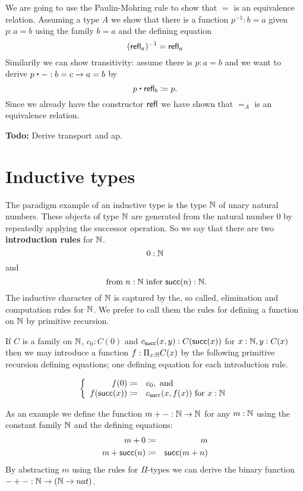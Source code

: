We are going to use the Paulin-Mohring rule to show that $=$ is an
equivalence relation. Assuming a type $A$ we show that there is a function
$p^{-1} : b = a$ given $p : a = b$ using the family $b = a$ and
the defining equation
\[ (\mathsf{refl}_{a})^{-1} = \mathsf{refl}_{a} \]
Similarily we can show transitivity: assume there is $p : a = b$ and
we want to derive $p \ct - : b = c \to a = b$ by
\[ p \ct \refl{b} \defeq p.\]
Since we already have the constructor $\mathsf{refl}_{}$ we have shown that $=_A$
is an equivalence relation. 


\textbf{Todo:} Derive transport and ap.

\section{Inductive types}
\label{sec:inductive-types}

The paradigm example of an inductive type is the type $\mathbb{N}$ of unary natural numbers.  These objects of type $\mathbb{N}$ are generated from the natural number $0$ by repeatedly applying the successor operation.  So we say that there are two {\bf introduction rules} for $\mathbb{N}$. 
  \[ 0:\mathbb{N}\]
and
  \[ \mbox{ from $n:\mathbb{N}$ infer $\mathsf{succ}(n):\mathbb{N}$}.\]
The inductive character of $\mathbb{N}$ is captured by the, so called, elimination and computation rules for $\mathbb{N}$.  We prefer to call them the rules for defining a function on $\mathbb{N}$ by primitive recursion. 

If $C$ is a family on $\mathbb{N}$, $c_0:C(0)$ and $c_{\mathsf{succ}}(x,y):C(\mathsf{succ}(x))$ for $x:\mathbb{N},y:C(x)$ then we may introduce a function $f:\Pi_{x:\mathbb{N}}C(x)$ by the following primitive recursion defining equations; one defining equation for each introduction rule.

  \[\left\{\begin{array}{rl}
f(0)\coloneqq& c_0, \mbox{ and}\\
f(\mathsf{succ}(x))\coloneqq& c_{\mathsf{succ}}(x,f(x))\mbox{ for } x:\mathbb{N}
  \end{array}\right.\]

As an example we define the function $m + - : \mathbb{N} \to \mathbb{N}$ for any
$m : \mathbb{N}$ using the constant family $\mathbb{N}$ and the defining
equations:
\begin{eqnarray*}
  m + 0 & \coloneqq & m \\
  m + \mathsf{succ}(n) & \coloneqq & \mathsf{succ}(m + n)
\end{eqnarray*}
By abstracting $m$ using the rules for $\Pi$-types we can derive the
binary function $- + - : \mathbb{N} \to (\mathbb{N} \to nat)$.

